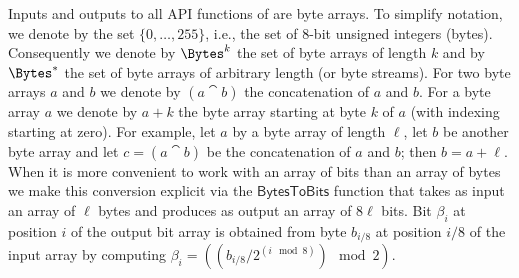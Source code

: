 Inputs and outputs to all API functions of \Kyber are byte arrays.
To simplify notation, we denote by \Bytes the set $\{0,\dots,255\}$, i.e., 
the set of $8$-bit unsigned integers (bytes). 
Consequently we denote by $\Bytes^k$ the set of byte arrays of length $k$
and by $\Bytes^*$ the set of byte arrays of arbitrary length (or byte streams).
For two byte arrays $a$ and $b$ we denote by $(a\cat b)$ the concatenation
of $a$ and $b$.
For a byte array $a$ we denote by $a+k$ the byte array
starting at byte $k$ of $a$ (with indexing starting at zero).
For example, let $a$ by a byte array of length $\ell$, let $b$
be another byte array and let $c = (a\cat b)$ be the concatenation
of $a$ and $b$; then $b = a+\ell$.
When it is more convenient to work with an array of bits than an
array of bytes we make this conversion explicit via the $\mathsf{BytesToBits}$ 
function that takes as input an array of $\ell$ bytes and produces as
output an array of $8\ell$ bits. Bit $\beta_i$ at position $i$ of the output bit array 
is obtained from byte $b_{i/8}$ at position $i/8$ of the input array
by computing $\beta_i = \left((b_{i/8} / 2^{(i\mod 8)}) \mod 2\right)$.

